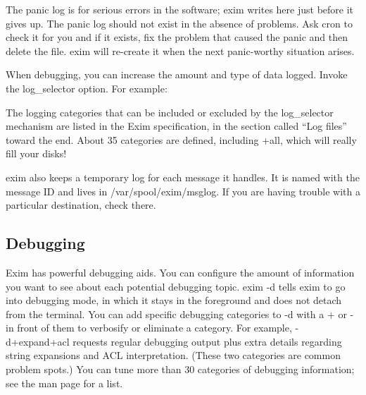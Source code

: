 The
\protect\hypertarget{part0026_split_055.htmlux5cux23_idIndexMarker2673}{}{}{panic}
log is for serious errors in the software; {exim} writes here just
before it gives up. The {panic} log should not exist in the absence of
problems. Ask {cron} to check it for you and if it exists, fix the
problem that caused the panic and then delete the file. {exim} will
re-create it when the next panic-worthy situation arises.

When debugging, you can increase the amount and type of data logged.
Invoke the {log\_selector} option. For
example:\protect\hypertarget{part0026_split_055.htmlux5cux23_idIndexMarker2674}{}{}


The logging categories that can be included or excluded by the
{log\_selector} mechanism are listed in the Exim specification, in the
section called ``Log files'' toward the end. About 35 categories are
defined, including {+all}, which will really fill your disks!

{exim} also keeps a temporary log for each message it handles. It is
named with the message ID and lives in
\protect\hypertarget{part0026_split_055.htmlux5cux23_idIndexMarker2675}{}{}{/var/spool/exim/msglog}.
If you are having trouble with a particular destination, check there.

\protect\hypertarget{part0026_split_056.html}{}{}

\hypertarget{part0026_split_056.htmlux5cux23_idContainer1247}{}
\hypertarget{part0026_split_056.htmlux5cux23calibre_pb_55}{%
\subsection[Debugging]{\texorpdfstring{\protect\hypertarget{part0026_split_056.htmlux5cux23_idTextAnchor1162}{}{}Debugging}{Debugging}}\label{part0026_split_056.htmlux5cux23calibre_pb_55}}

\protect\hypertarget{part0026_split_056.htmlux5cux23_idIndexMarker2676}{}{}\protect\hypertarget{part0026_split_056.htmlux5cux23_idIndexMarker2677}{}{}Exim
has powerful debugging aids. You can configure the amount of information
you want to see about each potential debugging topic. {exim -d} tells
{exim} to go into debugging mode, in which it stays in the foreground
and does not detach from the terminal. You can add specific debugging
categories to {-d} with a {+} or {-} in front of them to verbosify or
eliminate a category. For example, {-d+expand+acl} requests regular
debugging output plus extra details regarding string expansions and ACL
interpretation. (These two categories are common problem spots.) You can
tune more than 30 categories of debugging information; see the man page
for a list.

